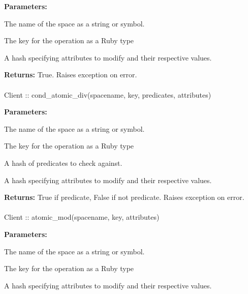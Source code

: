 \noindent\textbf{Parameters:}
\begin{description}[labelindent=\widthof{{\code{attributes}}},leftmargin=*,noitemsep,nolistsep,align=right]
\item[\code{spacename}] The name of the space as a string or symbol.
\item[\code{key}] The key for the operation as a Ruby type
\item[\code{attributes}] A hash specifying attributes to modify and their respective values.
\end{description}

\noindent\textbf{Returns:}
True.  Raises exception on error.

\paragraph{}
\label{api:ruby:cond_atomic_div}
\begin{rubycode}
Client :: cond_atomic_div(spacename, key, predicates, attributes)
\end{rubycode}


\noindent\textbf{Parameters:}
\begin{description}[labelindent=\widthof{{\code{predicates}}},leftmargin=*,noitemsep,nolistsep,align=right]
\item[\code{spacename}] The name of the space as a string or symbol.
\item[\code{key}] The key for the operation as a Ruby type
\item[\code{predicates}] A hash of predicates to check against.
\item[\code{attributes}] A hash specifying attributes to modify and their respective values.
\end{description}

\noindent\textbf{Returns:}
True if predicate, False if not predicate.  Raises exception on error.

\paragraph{}
\label{api:ruby:atomic_mod}
\begin{rubycode}
Client :: atomic_mod(spacename, key, attributes)
\end{rubycode}


\noindent\textbf{Parameters:}
\begin{description}[labelindent=\widthof{{\code{attributes}}},leftmargin=*,noitemsep,nolistsep,align=right]
\item[\code{spacename}] The name of the space as a string or symbol.
\item[\code{key}] The key for the operation as a Ruby type
\item[\code{attributes}] A hash specifying attributes to modify and their respective values.
\end{description}

